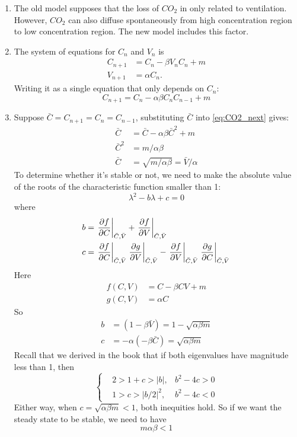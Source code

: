 \begin{homeworkProblem}
\begin{enumerate}
\item The old model supposes that the loss of $CO_2$ in only related to
ventilation. However, $CO_2$ can also diffuse spontaneously from high
concentration region to low concentration region. The new model includes this
factor.

\item The system of equations for $C_n$ and $V_n$ is \begin{align}
    C_{n+1} &= C_{n} - \beta V_nC_n + m\\
    V_{n+1} &= \alpha C_n.
\end{align}
Writing it as a single equation that only depends on $C_n$: \begin{equation}
    C_{n+1} = C_{n} - \alpha\beta C_n C_{n-1} + m \label{eq:CO2_next}
\end{equation}

\item Suppose $\bar C = C_{n+1} = C_n = C_{n-1}$, substituting $\bar C$ into
\eqref{eq:CO2_next} gives: \[
    \begin{aligned}
    \bar C &= \bar C - \alpha\beta\bar C^2 + m\\
    \bar C^2 &= m/\alpha\beta\\
    \bar C &= \sqrt{m/\alpha\beta} = \bar V/\alpha
    \end{aligned}
\]
To determine whether it's stable or not, we need to make the absolute value of
the roots of the characteristic function smaller than 1: \[
    \lambda^2 - b \lambda + c = 0
\]
where \[
    \begin{aligned}
        b &= \left.\frac{\partial f}{\partial C}\right|_{\bar C, \bar V} +
        \left.\frac{\partial f}{\partial V}\right|_{\bar C, \bar V} \\
        c &= \left.\frac{\partial f}{\partial C}\right|_{\bar C, \bar V}
        \left.\frac{\partial g}{\partial V}\right|_{\bar C, \bar V} -
        \left.\frac{\partial f}{\partial V}\right|_{\bar C, \bar V}
        \left.\frac{\partial g}{\partial C}\right|_{\bar C, \bar V}
    \end{aligned}
\]
Here \[
    \begin{aligned}
        f(C, V) &= C - \beta CV + m\\
        g(C, V) &= \alpha C
    \end{aligned}
\]
So \[
    \begin{aligned}
        b &= (1- \beta \bar V) = 1 - \sqrt{\alpha\beta m}\\
        c &= -\alpha(-\beta \bar C) = \sqrt{\alpha\beta m}
    \end{aligned}
\]
Recall that we derived in the book that if both eigenvalues have magnitude less
than 1, then \[
    \left\{
    \begin{aligned}
        &2 > 1 + c > |b|, & b^2 - 4c > 0\\
        &1 > c > |b/2|^2, & b^2 - 4c < 0
    \end{aligned}
    \right.
\]
Either way, when $c = \sqrt{\alpha\beta m} < 1$, both inequities hold. So
if we want the steady state to be stable, we need to have \[
    m\alpha \beta < 1
\]


\end{enumerate}
\end{homeworkProblem}
